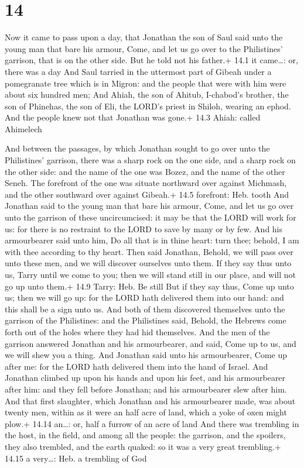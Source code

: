 \hypertarget{section-13}{%
\section{14}\label{section-13}}

 Now it came to pass upon a day, that Jonathan the son of
Saul said unto the young man that bare his armour, Come, and let us go
over to the Philistines' garrison, that is on the other side. But he
told not his father.+ 14.1 it came\ldots: or, there was a day
 And Saul tarried in the uttermost part of Gibeah under a
pomegranate tree which is in Migron: and the people that were with him
were about six hundred men;  And Ahiah, the son of Ahitub,
I-chabod's brother, the son of Phinehas, the son of Eli, the LORD's
priest in Shiloh, wearing an ephod. And the people knew not that
Jonathan was gone.+ 14.3 Ahiah: called Ahimelech

 And between the passages, by which Jonathan sought to go
over unto the Philistines' garrison, there was a sharp rock on the one
side, and a sharp rock on the other side: and the name of the one was
Bozez, and the name of the other Seneh.  The forefront of
the one was situate northward over against Michmash, and the other
southward over against Gibeah.+ 14.5 forefront: Heb. tooth 
And Jonathan said to the young man that bare his armour, Come, and let
us go over unto the garrison of these uncircumcised: it may be that the
LORD will work for us: for there is no restraint to the LORD to save by
many or by few.  And his armourbearer said unto him, Do all
that is in thine heart: turn thee; behold, I am with thee according to
thy heart.  Then said Jonathan, Behold, we will pass over
unto these men, and we will discover ourselves unto them. 
If they say thus unto us, Tarry until we come to you; then we will stand
still in our place, and will not go up unto them.+ 14.9 Tarry: Heb. Be
still  But if they say thus, Come up unto us; then we will
go up: for the LORD hath delivered them into our hand: and this shall be
a sign unto us.  And both of them discovered themselves
unto the garrison of the Philistines: and the Philistines said, Behold,
the Hebrews come forth out of the holes where they had hid themselves.
 And the men of the garrison answered Jonathan and his
armourbearer, and said, Come up to us, and we will shew you a thing. And
Jonathan said unto his armourbearer, Come up after me: for the LORD hath
delivered them into the hand of Israel.  And Jonathan
climbed up upon his hands and upon his feet, and his armourbearer after
him: and they fell before Jonathan; and his armourbearer slew after him.
 And that first slaughter, which Jonathan and his
armourbearer made, was about twenty men, within as it were an half acre
of land, which a yoke of oxen might plow.+ 14.14 an\ldots: or, half a
furrow of an acre of land  And there was trembling in the
host, in the field, and among all the people: the garrison, and the
spoilers, they also trembled, and the earth quaked: so it was a very
great trembling.+ 14.15 a very\ldots: Heb. a trembling of God

